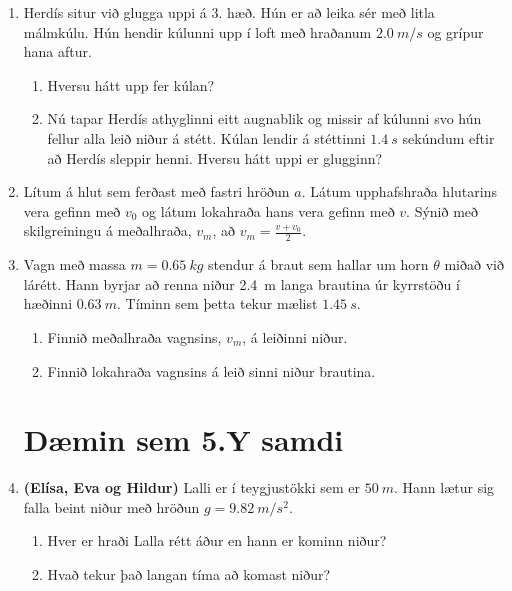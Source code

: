\begin{enumerate}[label = \textbf{Dæmi \thechapter.\arabic*.}]
\item Herdís situr við glugga uppi á $3.$ hæð. Hún er að leika sér með litla málmkúlu. Hún hendir kúlunni upp í loft með hraðanum $\SI{2.0}{m/s}$ og grípur hana aftur.
\begin{enumerate}[label = \textbf{(\alph*)}]
    \item Hversu hátt upp fer kúlan?
    \item Nú tapar Herdís athyglinni eitt augnablik og missir af kúlunni svo hún fellur alla leið niður á stétt. Kúlan lendir á stéttinni $\SI{1.4}{s}$ sekúndum eftir að Herdís sleppir henni. Hversu hátt uppi er glugginn?
\end{enumerate}

\item Lítum á hlut sem ferðast með fastri hröðun $a$. Látum upphafshraða hlutarins vera gefinn með $v_0$ og látum lokahraða hans vera gefinn með $v$. Sýnið með skilgreiningu á meðalhraða, $v_m$, að $v_m = \frac{v + v_0}{2}$.

\item Vagn með massa $m = \SI{0,65}{kg}$ stendur á braut sem hallar um horn $\theta$ miðað við lárétt. Hann byrjar að renna niður \SI{2,4}{m} langa brautina úr kyrrstöðu í hæðinni $\SI{0,63}{m}$. Tíminn sem þetta tekur mælist $\SI{1,45}{s}$.
    \begin{enumerate}[label = \textbf{(\alph*)}]
        \item Finnið meðalhraða vagnsins, $v_m$, á leiðinni niður.
        \item Finnið lokahraða vagnsins á leið sinni niður brautina.
    \end{enumerate}


\newpage



\section*{Dæmin sem 5.Y samdi}

\item \textbf{(Elísa, Eva og Hildur)} Lalli er í teygjustökki sem er $\SI{50}{m}$. Hann lætur sig falla beint niður með hröðun $g = \SI{9.82}{m/s^2}$.
\begin{enumerate}[label = \textbf{(\alph*)}]
    \item Hver er hraði Lalla rétt áður en hann er kominn niður?
    \item Hvað tekur það langan tíma að komast niður?
\end{enumerate}


\end{enumerate}
